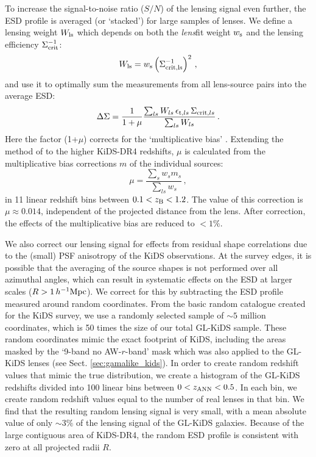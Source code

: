 \documentclass[usenatbib]{mnras}
\newcommand{\hMpc}{\, h^{-1}{\rm{Mpc}} }
\newcommand{\un}[1]{_{\rm #1}}
\begin{document}
To increase the signal-to-noise ratio ($S/N$) of the lensing signal even further, the ESD profile is averaged (or `stacked') for large samples of lenses. We define a lensing weight $W\un{ls}$ which depends on both the \emph{lens}fit weight $w\un{s}$ and the lensing efficiency $\Sigma\un{crit}^{-1}$:
\begin{equation}
	W_{\rm{ls}} = w_{\rm s} \left( \Sigma_{\rm crit,ls}^{-1} \right)^2 \, ,
	\label{eq:weights}
\end{equation}
and use it to optimally sum the measurements from all lens-source pairs into the average ESD:
\begin{equation}
	\Delta\Sigma = \frac{1}{1+\mu} \frac{\sum_{ls} W_{ls} \, \epsilon_{{\rm t},ls} \, \Sigma_{{\rm crit},ls} }{ \sum_{ls}{W_{ls}} }  \, .
	\label{eq:ESDmeasured}
\end{equation}
Here the factor (1+$\mu$) corrects for the `multiplicative bias' \cite[]{fenechconti2017}. Extending the method of \cite{dvornik2017} to the higher KiDS-DR4 redshifts, $\mu$ is calculated from the multiplicative bias corrections $m$ of the individual sources:
\begin{equation}
	\mu=\frac{\sum_{s} w_{s} m_{s}}{\sum_{ls} w_{s}} \, ,
	\label{eq:biascorr}
\end{equation}
in 11 linear redshift bins between \mbox{$0.1<z\un{B}<1.2$}. The value of this correction is $\mu\approx0.014$, independent of the projected distance from the lens. After correction, the effects of the multiplicative bias are reduced to $<1\%$.

We also correct our lensing signal for effects from residual shape correlations due to the (small) PSF anisotropy of the KiDS observations. At the survey edges, it is possible that the averaging of the source shapes is not performed over all azimuthal angles, which can result in systematic effects on the ESD at larger scales ($R>1\hMpc$). We correct for this by subtracting the ESD profile measured around random coordinates. From the basic random catalogue created for the KiDS survey, we use a randomly selected sample of $\sim5$ million coordinates, which is 50 times the size of our total GL-KiDS sample. These random coordinates mimic the exact footprint of KiDS, including the areas masked by the `9-band no AW-$r$-band' mask which was also applied to the GL-KiDS lenses (see Sect. \ref{sec:gamalike_kids}). In order to create random redshift values that mimic the true distribution, we create a histogram of the GL-KiDS redshifts divided into 100 linear bins between $0<z\un{ANN}<0.5$. In each bin, we create random redshift values equal to the number of real lenses in that bin. We find that the resulting random lensing signal is very small, with a mean absolute value of only $\sim3\%$ of the lensing signal of the GL-KiDS galaxies. Because of the large contiguous area of KiDS-DR4, the random ESD profile is consistent with zero at all projected radii $R$.
\end{document}
